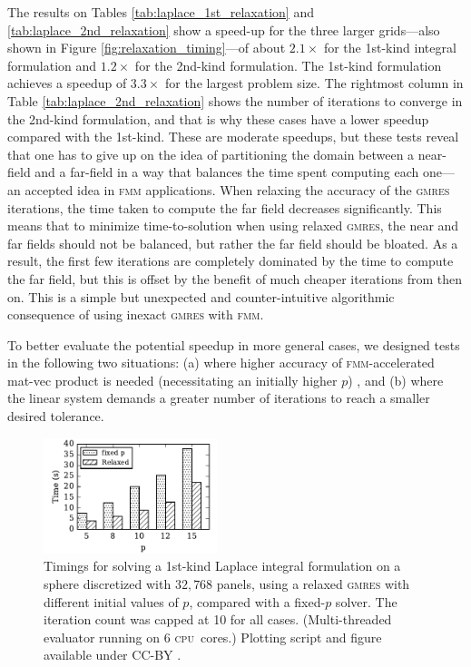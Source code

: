 \documentclass[final,3p,times]{elsarticle}
\newcommand{\cpu}{\textsc{cpu}}
\newcommand{\fmm}{\textsc{fmm}\xspace}
\newcommand{\gmres}{\textsc{gmres}\xspace}
\begin{document}
The results on Tables \ref{tab:laplace_1st_relaxation} and \ref{tab:laplace_2nd_relaxation} show a speed-up for the three larger grids---also shown in Figure \ref{fig:relaxation_timing}---of about $2.1\times$ for the 1st-kind integral formulation and $1.2\times$ for the 2nd-kind formulation. The 1st-kind formulation achieves a speedup of $3.3\times$ for the largest problem size. The rightmost column in Table \ref{tab:laplace_2nd_relaxation} shows the number of iterations to converge in the 2nd-kind formulation, and that is why these cases have a lower speedup compared with the 1st-kind. These are moderate speedups, but these tests reveal that one has to give up on the idea of partitioning the domain between a near-field and a far-field in a way that balances the time spent computing each one---an accepted idea in \fmm applications. When relaxing the accuracy of the \gmres iterations, the time taken to compute the far field decreases significantly. This means that to minimize time-to-solution when using relaxed \gmres, the near and far fields should not be balanced, but rather the far field should be bloated. As a result, the first few iterations are completely dominated by the time to compute the far field, but this is offset by the benefit of much cheaper iterations from then on. This is a simple but unexpected and counter-intuitive algorithmic consequence of using inexact \gmres with \fmm.

To better evaluate the potential speedup in more general cases, we designed tests in the following two situations: (a) where higher accuracy of \fmm-accelerated mat-vec product is needed (necessitating an initially higher $p$) , and (b) where the linear system demands a greater number of iterations to reach a smaller desired tolerance. 

\begin{figure}%
	\centering
	\includegraphics[natwidth=3in,natheight=2in,width=0.45\textwidth]{LaplaceRelaxationP.pdf}
	\caption{Timings for solving a 1st-kind Laplace integral formulation on a sphere discretized with $32,768$ panels, using a relaxed \gmres with different initial values of $p$, compared with a fixed-$p$ solver. The iteration count was capped at 10 for all cases. (Multi-threaded evaluator running on 6 \cpu\ cores.) Plotting script and figure available under CC-BY \cite{WangLaytonBarba2016-figshare2}.}
	\label{fig:laplace_p_speedup}
\end{figure}
\end{document}
